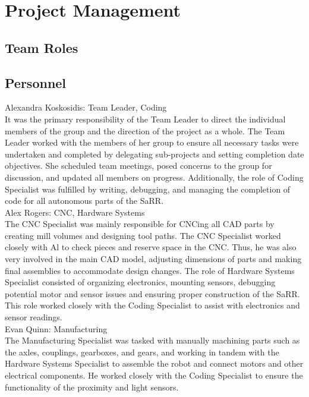 \section{Project Management}

\subsection{Team Roles}


\subsection{Personnel}
Alexandra Koskosidis: Team Leader, Coding\\

    It was the primary responsibility of the Team Leader to direct the individual members of the group and the direction of the project as a whole. The Team Leader worked with the members of her group to ensure all necessary tasks were undertaken and completed by delegating sub-projects and setting completion date objectives. She scheduled team meetings, posed concerns to the group for discussion, and updated all members on progress. Additionally, the role of Coding Specialist was fulfilled by writing, debugging, and managing the completion of code for all autonomous parts of the SaRR. \\
    
Alex Rogers: CNC, Hardware Systems\\

    The CNC Specialist was mainly responsible for CNCing all CAD parts by creating mill volumes and designing tool paths. The CNC Specialist worked closely with Al to check pieces and reserve space in the CNC. Thus, he was also very involved in the main CAD model, adjusting dimensions of parts and making final assemblies to accommodate design changes. The role of Hardware Systems Specialist consisted of organizing electronics, mounting sensors, debugging potential motor and sensor issues and ensuring proper construction of the SaRR. This role worked closely with the Coding Specialist to assist with electronics and sensor readings. \\
    
Evan Quinn: Manufacturing\\

    The Manufacturing Specialist was tasked with manually machining parts such as the axles, couplings, gearboxes, and gears, and working in tandem with the Hardware Systems Specialist to assemble the robot and connect motors and other electrical components. He worked closely with the Coding Specialist to ensure the functionality of the proximity and light sensors.\\
    
